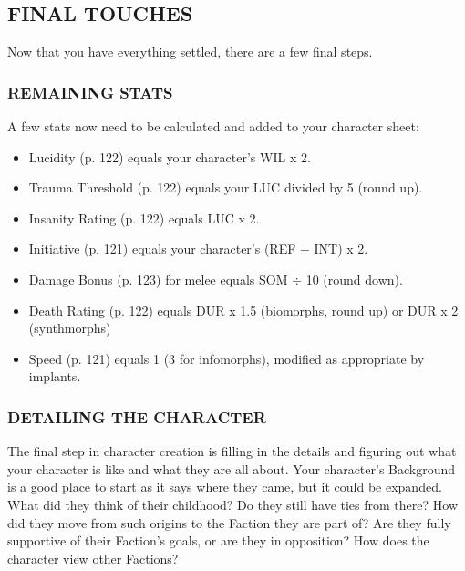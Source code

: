\subsection{FINAL TOUCHES}

Now that you have everything settled, there are a few final steps.

\subsubsection{REMAINING STATS}
A few stats now need to be calculated and added to your character sheet:

\begin{itemize}
\item Lucidity (p. 122) equals your character’s WIL x 2.
\item Trauma Threshold (p. 122) equals your LUC divided by 5 (round up).
\item Insanity Rating (p. 122) equals LUC x 2.
\item Initiative (p. 121) equals your character’s (REF + INT) x 2.
\item Damage Bonus (p. 123) for melee equals SOM $\div$ 10 (round down).
\item Death Rating (p. 122) equals DUR x 1.5 (biomorphs, round up) or DUR x 2
  (synthmorphs)
\item Speed (p. 121) equals 1 (3 for infomorphs), modified as appropriate by
  implants.
\end{itemize}

\subsubsection{DETAILING THE CHARACTER}
The final step in character creation is filling in the details and figuring
out what your character is like and what they are all about. Your character’s
Background is a good place to start as it says where they came, but it could be
expanded. What did they think of their childhood? Do they still have ties from
there? How did they move from such origins to the Faction they are part of? Are
they fully supportive of their Faction’s goals, or are they in opposition? How
does the character view other Factions?

